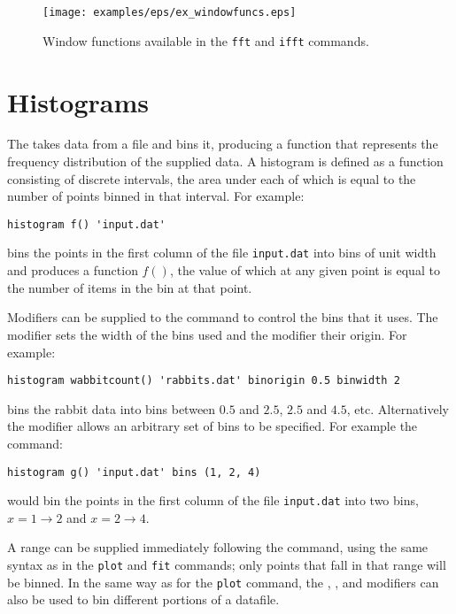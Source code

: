 \begin{figure}
\begin{center}
\texttt{[image: examples/eps/ex\_windowfuncs.eps]}
\end{center}
\caption{Window functions available in the {\tt fft} and {\tt ifft} commands.}
\label{fig:windowfuncs}
\end{figure}

\section{Histograms}

The  takes data from a file and bins it, producing a
function that represents the frequency distribution of the supplied data.  A
histogram is defined as a function consisting of discrete intervals, the area
under each of which is equal to the number of points binned in that interval.
For example:

\begin{verbatim}
histogram f() 'input.dat'
\end{verbatim}

\noindent bins the points in the first column of the file {\tt input.dat}
into bins of unit width and produces a function $f()$, the value of which at any
given point is equal to the number of items in the bin at that point.

Modifiers can be supplied to the  command to control the bins
that it uses.  The  modifier sets the width of the bins used
and the  modifier their origin.  For example:

\begin{verbatim}
histogram wabbitcount() 'rabbits.dat' binorigin 0.5 binwidth 2
\end{verbatim}

\noindent bins the rabbit data into bins between $0.5$ and $2.5$, $2.5$ and
$4.5$, etc.  Alternatively the  modifier allows an arbitrary set
of bins to be specified. For example the command:

\begin{verbatim}
histogram g() 'input.dat' bins (1, 2, 4)
\end{verbatim}

\noindent would bin the points in the first column of the file {\tt input.dat}
into two bins, $x=1\to 2$ and $x=2\to 4$.

A range can be supplied immediately following the command, using the same
syntax as in the {\tt plot} and {\tt fit} commands; only points that fall in
that range will be binned.  In the same way as for the {\tt plot} command,
the , ,  and 
modifiers can also be used to bin different portions of a datafile.

